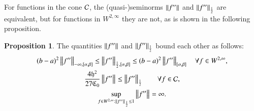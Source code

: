 \documentclass[review]{elsarticle}
\theoremstyle{definition}
\renewcommand{\cw}{W}
\newtheorem{prop}[theorem]{Proposition}
\begin{document}
For functions in the cone $\cc$, the (quasi-)seminorms $\norm{f''}$ and $\norm[\frac
12]{f''}$ are equivalent, but  for functions in $ \cw^{2,\infty}$ they are not, as is shown in the following proposition.

\begin{prop} \label{equivnormprop}
	The quantities $\norm{f''}$ and $\norm[\frac 12]{f''}$ bound each other as follows:
	\begin{subequations}
		\begin{gather}
		\label{halflessinf}
		(b-a)^2\norm[-\infty,{[\alpha,\beta]}]{f''}  \le \norm[\frac 12,{[\alpha,\beta]}]{f''}
		\le (b-a)^2 \norm[{[\alpha,\beta]}]{f''} \quad \forall f \in \cw^{2,\infty}, \\
		\label{inflesshalf}
		\frac{4\fh^2}{27\fC_0} \norm{f''} \le \norm[\frac 12]{f''} \qquad \forall f \in \cc, \\
		\label{infhalfnoteq}
		\sup_{f \in \cw^{2,\infty} :  \norm[\frac 12]{f''} \le 1}  \norm{f''}
		= \infty.
		\end{gather}
	\end{subequations}
\end{prop}
\end{document}

